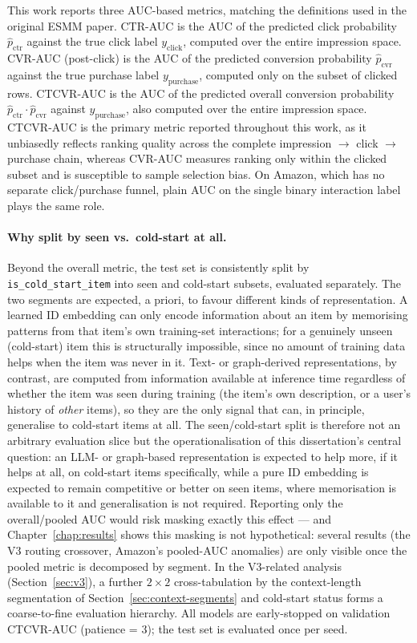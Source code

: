 \documentclass{uclthesis}
\begin{document}
This work reports three AUC-based metrics, matching the definitions used in the original ESMM paper. CTR-AUC is the AUC of the predicted click probability $\hat{p}_{\text{ctr}}$ against the true click label $y_{\text{click}}$, computed over the entire impression space. CVR-AUC (post-click) is the AUC of the predicted conversion probability $\hat{p}_{\text{cvr}}$ against the true purchase label $y_{\text{purchase}}$, computed only on the subset of clicked rows. CTCVR-AUC is the AUC of the predicted overall conversion probability $\hat{p}_{\text{ctr}} \cdot \hat{p}_{\text{cvr}}$ against $y_{\text{purchase}}$, also computed over the entire impression space. CTCVR-AUC is the primary metric reported throughout this work, as it unbiasedly reflects ranking quality across the complete impression $\to$ click $\to$ purchase chain, whereas CVR-AUC measures ranking only within the clicked subset and is susceptible to sample selection bias. On Amazon, which has no separate click/purchase funnel, plain AUC on the single binary interaction label plays the same role.

\paragraph{Why split by seen vs.\ cold-start at all.} Beyond the overall metric, the test set is consistently split by \texttt{is\_cold\_start\_item} into seen and cold-start subsets, evaluated separately. The two segments are expected, a priori, to favour different kinds of representation. A learned ID embedding can only encode information about an item by memorising patterns from that item's own training-set interactions; for a genuinely unseen (cold-start) item this is structurally impossible, since no amount of training data helps when the item was never in it. Text- or graph-derived representations, by contrast, are computed from information available at inference time regardless of whether the item was seen during training (the item's own description, or a user's history of \emph{other} items), so they are the only signal that can, in principle, generalise to cold-start items at all. The seen/cold-start split is therefore not an arbitrary evaluation slice but the operationalisation of this dissertation's central question: an LLM- or graph-based representation is expected to help more, if it helps at all, on cold-start items specifically, while a pure ID embedding is expected to remain competitive or better on seen items, where memorisation is available to it and generalisation is not required. Reporting only the overall/pooled AUC would risk masking exactly this effect --- and Chapter~\ref{chap:results} shows this masking is not hypothetical: several results (the V3 routing crossover, Amazon's pooled-AUC anomalies) are only visible once the pooled metric is decomposed by segment. In the V3-related analysis (Section~\ref{sec:v3}), a further $2\times2$ cross-tabulation by the context-length segmentation of Section~\ref{sec:context-segments} and cold-start status forms a coarse-to-fine evaluation hierarchy. All models are early-stopped on validation CTCVR-AUC (patience = 3); the test set is evaluated once per seed.
\end{document}
